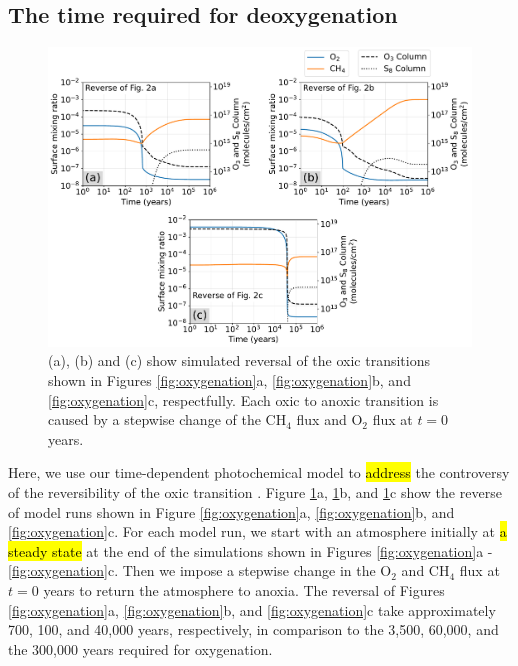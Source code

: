 \documentclass[9pt,twocolumn,twoside,lineno]{pnas-new}
\begin{document}
\subsection*{The time required for deoxygenation} \label{sec:deoxygenation}

\begin{figure}
    \centering
    \includegraphics[width=\textwidth]{Reversibility.pdf}
    \caption{(a), (b) and (c) show simulated reversal of the oxic transitions shown in Figures \ref{fig:oxygenation}a, \ref{fig:oxygenation}b, and \ref{fig:oxygenation}c, respectfully. Each oxic to anoxic transition is caused by a stepwise change of the CH$_4$ flux and O$_2$ flux at $t=0$ years.}
    \label{fig:reverse}
\end{figure}


Here, we use our time-dependent photochemical model to \hl{address} the controversy of the reversibility of the oxic transition \cite{Poulton_2021, Izon_2022}. Figure \ref{fig:reverse}a, \ref{fig:reverse}b, and \ref{fig:reverse}c show the reverse of model runs shown in Figure \ref{fig:oxygenation}a, \ref{fig:oxygenation}b, and  \ref{fig:oxygenation}c. For each model run, we start with an atmosphere initially at \hl{a steady state} at the end of the simulations shown in Figures \ref{fig:oxygenation}a - \ref{fig:oxygenation}c. Then we impose a stepwise change in the O$_2$ and CH$_4$ flux at $t = 0$ years to return the atmosphere to anoxia. The reversal of Figures \ref{fig:oxygenation}a, \ref{fig:oxygenation}b, and \ref{fig:oxygenation}c take approximately 700, 100, and 40,000 years, respectively, in comparison to the 3,500, 60,000, and the 300,000 years required for oxygenation.
\end{document}
